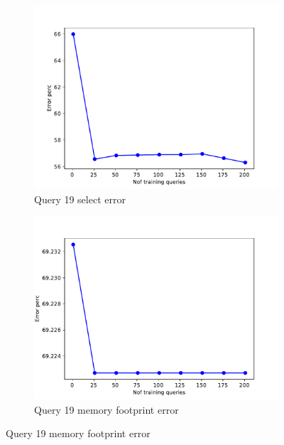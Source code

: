 \begin{figure}[!htb]
    \begin{subfigure}[t]{0.5\textwidth}
      \includegraphics[scale=0.4]{figs/tpch10/tpch10_sel19_error.pdf}
      \caption{Query 19 select error}
      \label{fig:tpch_sel19}
    \end{subfigure}
    \begin{subfigure}[t]{0.5\textwidth}
      \includegraphics[scale=0.4]{figs/tpch10/tpch10_q19_memerror.pdf}
      \caption{Query 19 memory footprint error}
      \label{fig:tpch_mem19}
    \end{subfigure}



\end{figure}
